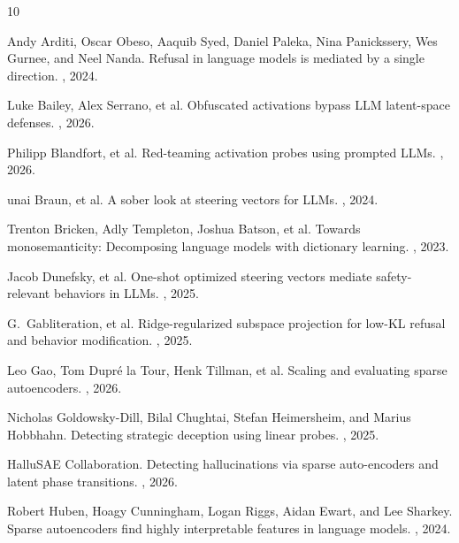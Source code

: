 \documentclass{article}
\begin{document}

\begin{thebibliography}{10}

Andy Arditi, Oscar Obeso, Aaquib Syed, Daniel Paleka, Nina Panickssery, Wes Gurnee, and Neel Nanda.
\newblock Refusal in language models is mediated by a single direction.
, 2024.

Luke Bailey, Alex Serrano, et al.
\newblock Obfuscated activations bypass LLM latent-space defenses.
, 2026.

Philipp Blandfort, et al.
\newblock Red-teaming activation probes using prompted LLMs.
, 2026.

unai Braun, et al.
\newblock A sober look at steering vectors for LLMs.
, 2024.

Trenton Bricken, Adly Templeton, Joshua Batson, et al.
\newblock Towards monosemanticity: Decomposing language models with dictionary learning.
, 2023.

Jacob Dunefsky, et al.
\newblock One-shot optimized steering vectors mediate safety-relevant behaviors in LLMs.
, 2025.

G.\ Gabliteration, et al.
\newblock Ridge-regularized subspace projection for low-KL refusal and behavior modification.
, 2025.

Leo Gao, Tom Dupr\'e la Tour, Henk Tillman, et al.
\newblock Scaling and evaluating sparse autoencoders.
, 2026.

Nicholas Goldowsky-Dill, Bilal Chughtai, Stefan Heimersheim, and Marius Hobbhahn.
\newblock Detecting strategic deception using linear probes.
, 2025.

HalluSAE Collaboration.
\newblock Detecting hallucinations via sparse auto-encoders and latent phase transitions.
, 2026.

Robert Huben, Hoagy Cunningham, Logan Riggs, Aidan Ewart, and Lee Sharkey.
\newblock Sparse autoencoders find highly interpretable features in language models.
, 2024.


\end{thebibliography}
\end{document}
